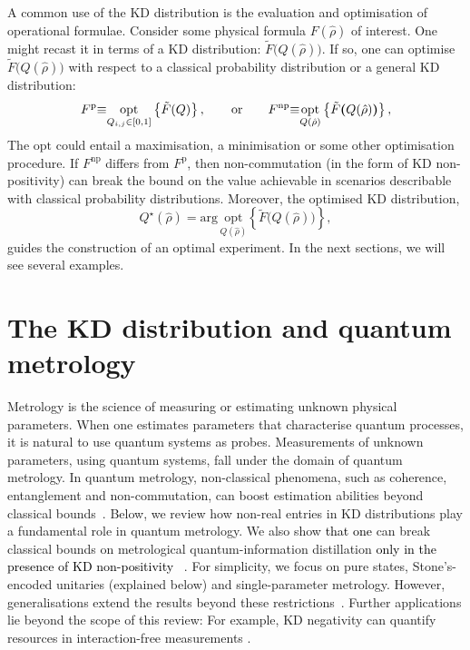 \documentclass[%
 reprint,
superscriptaddress,
nofootinbib,
bibnotes,
 amsmath,amssymb,
 aps,
]{revtex4-1}
\theoremstyle{plain}
\newcommand{\Dave}[1]{\textcolor{black}{#1} }
\newcommand{\nicole}[1]{\textcolor{black}{#1} }
\newcommand{\LParen}{ \bm{(} }
\newcommand{\RParen}{ \bm{)} }
\begin{document}
A common use of the KD distribution is the evaluation and optimisation of operational formulae.
Consider some physical formula $F(\hat{\rho})$ of interest.  
One might recast it in terms of a KD distribution:
$\tilde{F} \LParen Q(\hat{\rho}) \RParen$.  
If so, one can optimise $\tilde{F} \LParen Q(\hat{\rho}) \RParen$ with respect to a  classical probability distribution  or a general KD distribution:
\begin{align}
F^{\mathrm{p}}  \nicole{\equiv} 
\underset{ Q_{i,j} \in [0,1] }{\mathrm{opt}} \left\{ \tilde{F}(Q) \right\} ,  
\quad \quad \mathrm{or} \quad \quad
 F^{\mathrm{np}}  \nicole{\equiv} 
 \underset{Q(\hat{\rho})  }{\mathrm{opt}} 
 \left\{ \tilde{F}\LParen Q(\hat{\rho}) \RParen \right\}  ,
\end{align}
The $\mathrm{opt}$ could entail a maximisation, a minimisation or some other optimisation procedure. If $F^{\mathrm{np}} $ differs from $F^{\mathrm{p}} $, then  non-commutation
(in the form of KD non-positivity) can break the bound
on the value
achievable in scenarios  
describable with classical probability distributions. 
Moreover, the optimised KD distribution, 
\begin{equation}
Q^{\star}(\hat{\rho}) = \mathrm{arg \, } \underset{Q(\hat{\rho})  }{\mathrm{ opt}} \left\{ \tilde{F} \LParen Q(\hat{\rho}) \RParen \right\} ,
\end{equation}
guides the construction of an optimal experiment. In the next sections, we will see several examples. 

\section{The KD distribution and quantum metrology}

\label{Sec:Metrology}

Metrology is the science of measuring or estimating unknown physical parameters.  When one estimates parameters 
that characterise quantum processes, it is natural to use quantum systems as probes.
Measurements of unknown parameters, using quantum systems, 
fall under the domain of quantum metrology. In quantum metrology, non-classical phenomena, such as coherence, entanglement and non-commutation, can boost estimation abilities beyond classical bounds~\cite{Helstrom76,Braunstein94,bCover06,Giovanetti06, Giovanetti11, Krischek11, Demkowicz14, Smith22, Smith23, ArvidssonShukur20}.   Below, we review how non-real entries in  KD distributions play a fundamental role in quantum metrology. We also show \Dave{that one} can break classical bounds on metrological quantum-information distillation \Dave{only in the presence of KD non-positivity}~\cite{ArvidssonShukur20}.  For simplicity, we focus on pure states, Stone's-encoded unitaries  (explained below) and single-parameter metrology. However, generalisations  extend the results beyond these restrictions~\cite{ Jenne22,Lupu22,Salvati23}.  Further applications lie beyond the scope of this review: For example,  KD negativity can quantify resources in interaction-free measurements \cite{Hance_2024}. 
\end{document}
